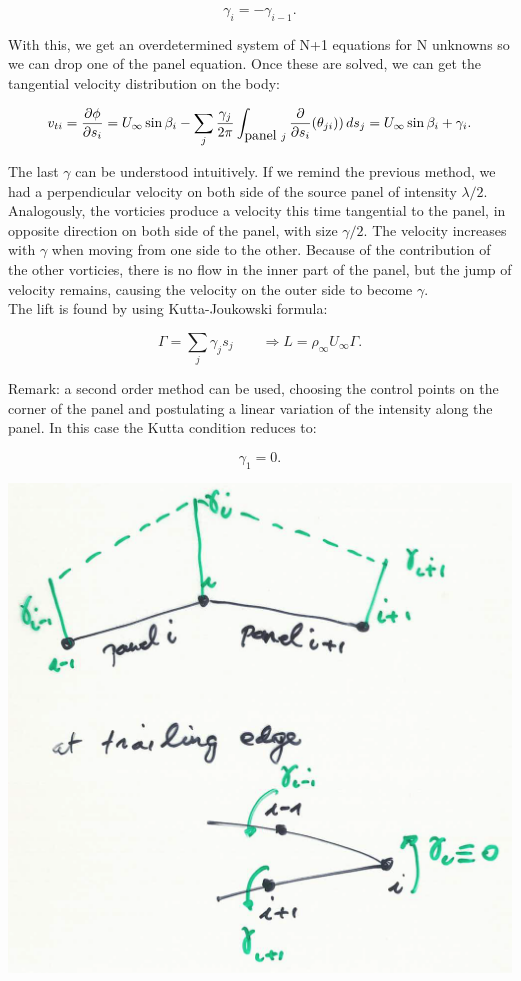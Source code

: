 	\begin{equation}
	\gamma _{i} = - \gamma _{i-1}.
	\end{equation}
	 
	 With this, we get an overdetermined system of N+1 equations for N unknowns so we can drop one of the panel equation. Once these are solved, we can get the tangential velocity distribution on the body:
	 
	 \begin{equation}
	 v_{ti} = \frac{\D \phi}{\D s_i} = U_\infty \sin \beta _i - \sum _j \frac{\gamma _j}{2\pi} \int _{\mbox{panel }j} \frac{\D}{\D s_i} (\theta_{ji})) \, ds_j = U_\infty \sin \beta _i + \gamma _i.
	 \end{equation}
	 
	 The last $\gamma$ can be understood intuitively. If we remind the previous method, we had a perpendicular velocity on both side of the source panel of intensity $\lambda /2$. Analogously, the vorticies produce a velocity this time tangential to the panel, in opposite direction on both side of the panel, with size $\gamma /2$. The velocity increases with $\gamma$ when moving from one side to the other. Because of the contribution of the other vorticies, there is no flow in the inner part of the panel, but the jump of velocity remains, causing the velocity on the outer side to become $\gamma$. \\
	 
	 The lift is found by using Kutta-Joukowski formula:
	 
	 \begin{equation}
	 \Gamma = \sum _j \gamma _j s_j\qquad \Rightarrow L = \rho _\infty U_\infty \Gamma.
	 \end{equation}
	 
	 Remark: a second order method can be used, choosing the control points on the corner of the panel and postulating a linear variation of the intensity along the panel. In this case the Kutta condition reduces to:
	 
	 \begin{equation}
	 \gamma _1 = 0.
	 \end{equation}
	 
	 \begin{center}
	 \includegraphics[scale=0.3]{ch2/44}
	 \end{center}
